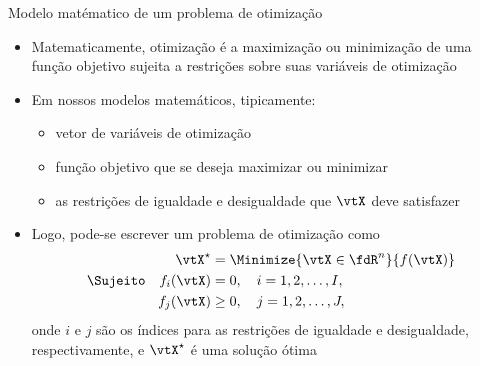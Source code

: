 \begin{frame}{Modelo matématico de um problema de otimização}
  \begin{itemize}
    \item \alert{Matematicamente, otimização é a maximização ou minimização de uma função objetivo sujeita a restrições sobre suas variáveis de otimização}
    \item Em nossos modelos matemáticos, tipicamente:
    \begin{itemize}
      \item {}  vetor de \alert{variáveis de otimização}
      \item {}  \alert{função objetivo} que se deseja maximizar ou minimizar
      \item {}  as \alert{restrições} de igualdade e desigualdade que $\vtX$ deve satisfazer
    \end{itemize}
    \item Logo, pode-se escrever um problema de otimização como
    \begin{subequations}\label{eq_prob_otimizacao}
      \begin{align}
        \vtX^\star &= \Minimize{\vtX \in \fdR^n}{f(\vtX)} \\
        \Sujeito \quad f_i(\vtX) &= 0, \quad i = 1, 2, \ldots, I, \\
        f_j(\vtX) &\geq 0, \quad j = 1, 2, \ldots, J,
      \end{align}
    \end{subequations}
    onde $i$ e $j$ são os índices para as restrições de igualdade e desigualdade, respectivamente, e $ \vtX^\star $ é uma \alert{solução ótima}
  \end{itemize}
\end{frame}

